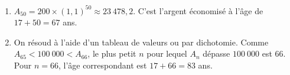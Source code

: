 {\begin{enumerate}
		On utilise l'expression algébrique de $A_n$ qui est
			\[ A_n = 200 \times (1,1)^n, \]
		pour trouver $A(34) \approx 5109,5.$
		\item $A_{50} = 200 \times (1,1)^{50} \approx 23~478,2$.
		C'est l'argent économisé à l'âge de $17+50 = 67$ ans.
		\item 
		On résoud à l'aide d'un tableau de valeurs ou par dichotomie.
		Comme $A_{65} < 100~000 < A_{66}$, le plus petit $n$ pour lequel $A_n$ dépasse $100~000$ est $66$.
		Pour $n=66$, l'âge correspondant est $17+66 = 83$ ans.
	\end{enumerate}
 
 }
 
 
% 
% 	
% 
%		
% 
